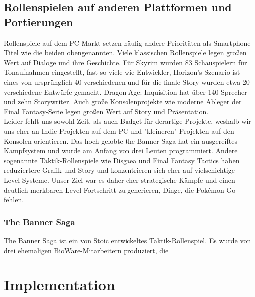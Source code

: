 \documentclass[extern,palatino]{cgBA}
\begin{document}
\subsection{Rollenspielen auf anderen Plattformen und Portierungen}
Rollenspiele auf dem PC-Markt setzen häufig andere Prioritäten als Smartphone Titel wie die beiden obengenannten. Viele klassischen Rollenspiele legen großen Wert auf Dialoge und ihre Geschichte. Für Skyrim wurden 83 Schauspielern für Tonaufnahmen eingestellt, fast so viele wie Entwickler, Horizon's Szenario ist eines von ursprünglich 40 verschiedenen und für die finale Story wurden etwa 20 verschiedene Entwürfe gemacht. Dragon Age: Inquisition hat über 140 Sprecher und zehn Storywriter.  %
Auch große Konsolenprojekte wie moderne Ableger der Final Fantasy-Serie legen großen Wert auf Story und Präsentation.
\\Leider fehlt uns sowohl Zeit, als auch Budget für derartige Projekte, weshalb wir uns eher an Indie-Projekten auf dem PC und "kleineren" Projekten auf den Konsolen orientieren. Das hoch gelobte the Banner Saga hat ein ausgereiftes Kampfsystem und wurde am Anfang von drei Leuten programmiert. Andere sogenannte Taktik-Rollenspiele wie Disgaea und Final Fantasy Tactics haben reduziertere Grafik und Story und konzentrieren sich eher auf vielschichtige Level-Systeme. Unser Ziel war es daher eher strategische Kämpfe und einen deutlich merkbaren Level-Fortschritt zu generieren, Dinge, die Pokémon Go fehlen.
\newpage
\subsubsection{The Banner Saga}
The Banner Saga ist ein von Stoic entwickeltes Taktik-Rollenspiel. Es wurde von drei ehemaligen BioWare-Mitarbeitern produziert, die 

\section{Implementation}
\end{document}
